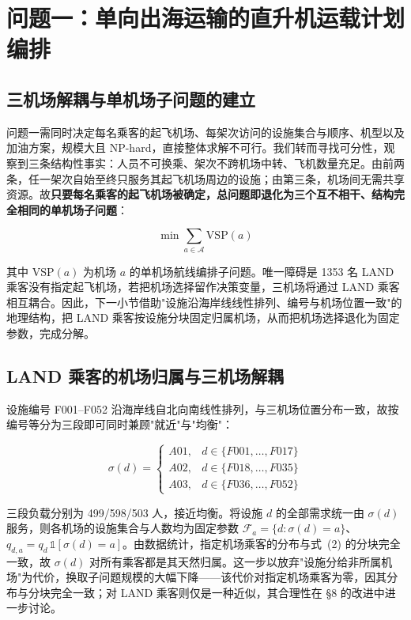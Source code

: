 \documentclass[zihao=-4,a4paper]{ctexart}
\begin{document}
\section{问题一：单向出海运输的直升机运载计划编排}

\subsection{三机场解耦与单机场子问题的建立}

问题一需同时决定每名乘客的起飞机场、每架次访问的设施集合与顺序、机型以及加油方案，规模大且 NP-hard，直接整体求解不可行。我们转而寻找可分性，观察到三条结构性事实：人员不可换乘、架次不跨机场中转、飞机数量充足。由前两条，任一架次自始至终只服务其起飞机场周边的设施；由第三条，机场间无需共享资源。故\textbf{只要每名乘客的起飞机场被确定，总问题即退化为三个互不相干、结构完全相同的单机场子问题}：

\begin{equation}
  \min \sum_{a\in\mathcal{A}} \mathrm{VSP}(a)
\end{equation}

其中 $\mathrm{VSP}(a)$ 为机场 $a$ 的单机场航线编排子问题。唯一障碍是 1353 名 LAND 乘客没有指定起飞机场，若把机场选择留作决策变量，三机场将通过 LAND 乘客相互耦合。因此，下一小节借助"设施沿海岸线线性排列、编号与机场位置一致"的地理结构，把 LAND 乘客按设施分块固定归属机场，从而把机场选择退化为固定参数，完成分解。

\subsection{LAND 乘客的机场归属与三机场解耦}

设施编号 F001--F052 沿海岸线自北向南线性排列，与三机场位置分布一致，故按编号等分为三段即可同时兼顾"就近"与"均衡"：

\begin{equation}
  \sigma(d)=\begin{cases}
    A01, & d\in\{F001,\dots,F017\}\\
    A02, & d\in\{F018,\dots,F035\}\\
    A03, & d\in\{F036,\dots,F052\}
  \end{cases}
\end{equation}

三段负载分别为 499/598/503 人，接近均衡。将设施 $d$ 的全部需求统一由 $\sigma(d)$ 服务，则各机场的设施集合与人数均为固定参数 $\mathcal{F}_a=\{d:\sigma(d)=a\}$、$q_{d,a}=q_d\,\mathbb{1}[\sigma(d)=a]$。由数据统计，指定机场乘客的分布与式~(2) 的分块完全一致，故 $\sigma(d)$ 对所有乘客都是其天然归属。这一步以放弃"设施分给非所属机场"为代价，换取子问题规模的大幅下降——该代价对指定机场乘客为零，因其分布与分块完全一致；对 LAND 乘客则仅是一种近似，其合理性在 §8 的改进中进一步讨论。
\end{document}
